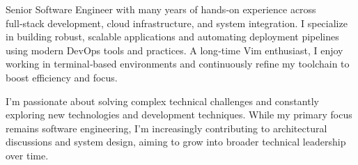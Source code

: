 

\begin{cvparagraph}

Senior Software Engineer with many years of hands‑on experience across full‑stack development, cloud infrastructure, and system integration. I specialize in building robust, scalable applications and automating deployment pipelines using modern DevOps tools and practices. A long‑time Vim enthusiast, I enjoy working in terminal‑based environments and continuously refine my toolchain to boost efficiency and focus.

I’m passionate about solving complex technical challenges and constantly exploring new technologies and development techniques. While my primary focus remains software engineering, I’m increasingly contributing to architectural discussions and system design, aiming to grow into broader technical leadership over time.
\end{cvparagraph}
